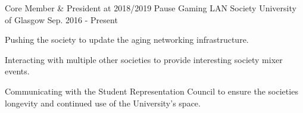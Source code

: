 

\begin{cventries}

  \cventry
    {Core Member \& President at 2018/2019} %
    {Pause Gaming LAN Society} %
    {University of Glasgow} %
    {Sep. 2016 - Present} %
    {
      \begin{cvitems} %
        \item {Pushing the society to update the aging networking infrastructure.}
        \item {Interacting with multiple other societies to provide interesting society mixer events.}
	\item {Communicating with the Student Representation Council to ensure the societies longevity and continued use of the University's space.}
      \end{cvitems}
    }

\end{cventries}
